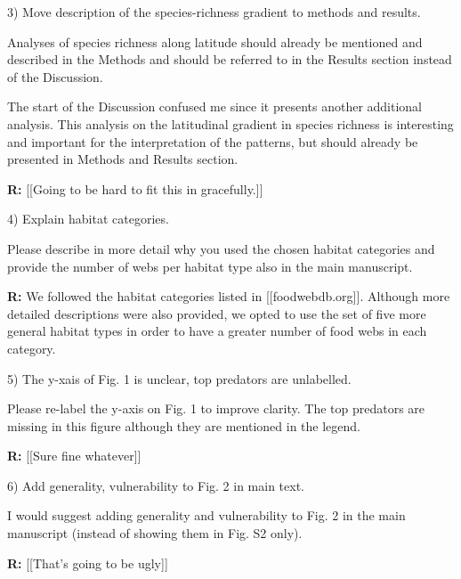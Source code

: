 \documentclass[12pt]{letter}
\newenvironment{refquote}{\bigskip \begin{it}}{\end{it}\smallskip}
\begin{document}
  3) Move description of the species-richness gradient to methods and results.


  \begin{refquote}

     Analyses of species richness along latitude should already be mentioned
     and described in the Methods and should be referred to in the Results
     section instead of the Discussion.

     \smallskip

      The start of the Discussion confused me since it presents another
      additional analysis. This analysis on the latitudinal gradient in
      species richness is interesting and important for the interpretation of
      the patterns, but should already be presented in Methods and Results
      section.

  \end{refquote}

  \textbf{R:} [[Going to be hard to fit this in gracefully.]]


  4) Explain habitat categories.

  \begin{refquote}

    Please describe in more detail why you used the chosen habitat categories
    and provide the number of webs per habitat type also in the main
    manuscript.

  \end{refquote}


  \textbf{R:} We followed the habitat categories listed in [[foodwebdb.org]].
  Although more detailed descriptions were also    provided, we opted to use the
  set of five more general habitat types in order to have a greater number of
  food webs in each category.


  5) The y-xais of Fig. 1 is unclear, top predators are unlabelled.


  \begin{refquote}

    Please re-label the y-axis on Fig. 1 to improve clarity. The top predators
    are missing in this figure although they are mentioned in the legend.

  \end{refquote}

  \textbf{R:} [[Sure fine whatever]]


  6) Add generality, vulnerability to Fig. 2 in main text.

  \begin{refquote}

    I would suggest adding generality and vulnerability to Fig. 2 in the main
    manuscript (instead of showing them in Fig. S2 only).

  \end{refquote}

  \textbf{R:} [[That's going to be ugly]]





  \newpage



\end{document}
